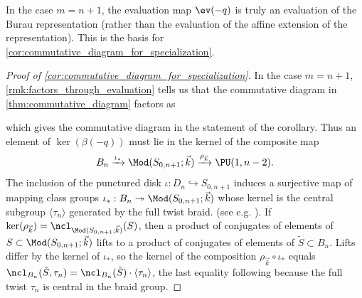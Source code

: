 \documentclass{amsart}
\begin{document}
    In the case $m=n+1$, the evaluation map $\ev(-q)$ is truly an evaluation of the Burau representation (rather than the evaluation of the affine extension of the representation). This is the basis for \cref{cor:commutative_diagram_for_specialization}.

    \begin{proof}[Proof of \cref{cor:commutative_diagram_for_specialization}]
        In the case $m=n+1$, \cref{rmk:factors_through_evaluation} tells us that the commutative diagram in \cref{thm:commutative_diagram} factors as
        \begin{center}
        \end{center}
        which gives the commutative diagram in the statement of the corollary. Thus an element of $\ker (\beta(-q))$ must lie in the kernel of the composite map
        \begin{equation*}
            B_n \xrightarrow{\iota_*} \Mod(S_{0,n+1};\vec k) \xrightarrow{\rho_{\vec k}} \PU(1,n-2). %
        \end{equation*}
        The inclusion of the punctured disk $\iota:D_n \hookrightarrow S_{0,n+1}$ induces a surjective map of mapping class groups $\iota_*:B_n \twoheadrightarrow \Mod(S_{0,n+1};\vec k)$ whose kernel is the central subgroup $\langle \tau_n \rangle$ generated by the full twist braid. (see e.g. \cite[Proposition 3.19]{Farb2012AGroups}). If $\ker (\rho_{\vec k}) = \ncl_{\Mod(S_{0,n+1};\vec k)}(S)$, then a product of conjugates of elements of $S \subset \Mod(S_{0,n+1};\vec k)$ lifts to a product of conjugates of elements of $\tilde S \subset B_n$.  Lifts differ by the kernel of $\iota_*$, so the kernel of the composition $\rho_{\vec k} \circ \iota_*$ equals $\ncl_{B_n}(\tilde S,\tau_n) = \ncl_{B_n}(\tilde S) \cdot \langle \tau_n \rangle$, the last equality following because the full twist $\tau_n$ is central in the braid group.
    \end{proof}
    
\end{document}
